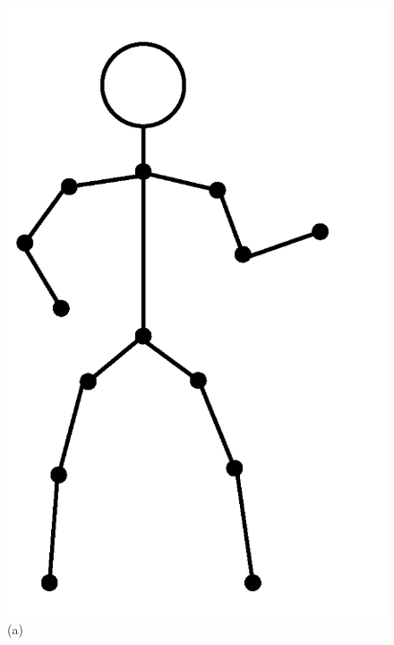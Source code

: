 \begin{figure}[!ht]
    \centering
    \begin{minipage}{.33\textwidth}
       \centering
       \includegraphics[width=\linewidth]{figure/ch2_fig_personal_kinematic_model.png}
       \caption*{(a)}
    \end{minipage}%
    \begin{minipage}{.33\textwidth}
       \centering

\end{minipage}
\end{figure}
